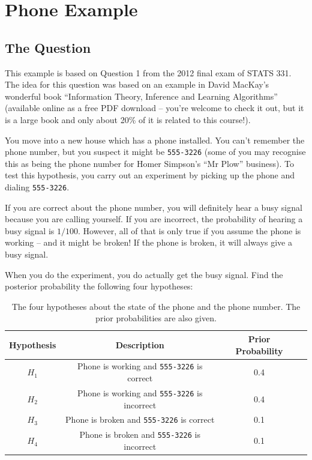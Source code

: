 \section{Phone Example}
\subsection{The Question}
This example is based on Question 1 from the 2012 final exam of STATS 331. The
idea for this question was based on an example in David MacKay's wonderful book
``Information Theory, Inference and Learning Algorithms''
(available online as a free PDF download -- you're welcome to check it out, but
it is a large book and only about 20\% of it is related to this course!).

You move into a new house which has a phone
installed. You can't remember the phone number, but you suspect it
might be {\tt 555-3226} (some of you may recognise
this as being the phone number for Homer Simpson's ``Mr Plow'' business).
To test this hypothesis, you carry out an experiment
by picking up the phone and dialing {\tt 555-3226}.

If you are correct about
the phone number, you will definitely hear a busy signal because you are calling
yourself.
If you are incorrect, the probability of hearing a busy signal is $1/100$.
However, all of that is only true if you assume the phone is working -- and it
might be broken! If the phone is broken, it will always give a busy signal.

When you do the experiment, you do actually get the busy signal.
Find the posterior probability the following four hypotheses:
\begin{table}[h!]
\begin{center}
\begin{tabular}{|c|c|c|c|}
\hline
Hypothesis & Description & Prior Probability\\
\hline
$H_1$ & Phone is working and {\tt 555-3226} is correct & 0.4\\
$H_2$ & Phone is working and {\tt 555-3226} is incorrect & 0.4\\
$H_3$ & Phone is broken and {\tt 555-3226} is correct & 0.1\\
$H_4$ & Phone is broken and {\tt 555-3226} is incorrect & 0.1\\
\hline
\end{tabular}
\caption{The four hypotheses about the state of the phone and the phone
number. The prior probabilities are also given.\label{tab:phone}}
\end{center}
\end{table}

